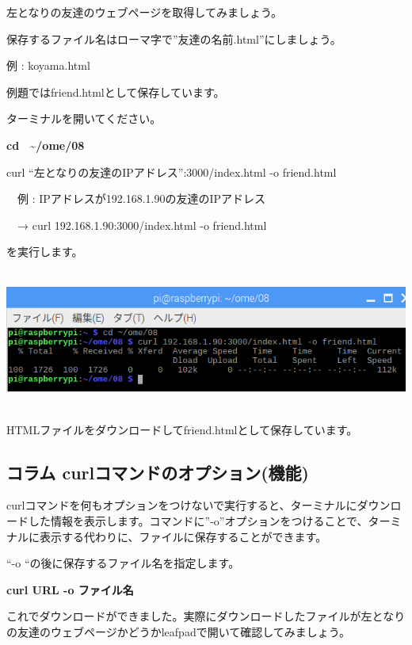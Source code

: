 \documentclass[a4paper,12pt,dvipdfmx]{jarticle}
\begin{document}
左となりの友達のウェブページを取得してみましょう。

保存するファイル名はローマ字で”友達の名前.html”にしましょう。

例 : koyama.html

例題ではfriend.htmlとして保存しています。

ターミナルを開いてください。

\textbf{cd \ \~{}/ome/08}

curl “左となりの友達のIPアドレス”:3000/index.html -o
friend.html

\ \ 例 :
IPアドレスが192.168.1.90の友達のIPアドレス

\ \ → curl 192.168.1.90:3000/index.html -o friend.html

を実行します。

\begin{center}
\includegraphics[width=17.006cm,height=4.553cm]{textbook-img005.png}

\end{center}

\bigskip

HTMLファイルをダウンロードしてfriend.htmlとして保存しています。



\begin{center}
\begin{boxedminipage}{17.228cm}
\section*{コラム
curlコマンドのオプション(機能)}

\bigskip

curlコマンドを何もオプションをつけないで実行すると、ターミナルにダウンロードした情報を表示します。コマンドに”-o”オプションをつけることで、ターミナルに表示する代わりに、ファイルに保存することができます。

“-o
“の後に保存するファイル名を指定します。

	\textbf{curl URL -o ファイル名}
\end{boxedminipage}
\end{center}
\clearpage
これでダウンロードができました。実際にダウンロードしたファイルが左となりの友達のウェブページかどうかleafpadで開いて確認してみましょう。
\end{document}
